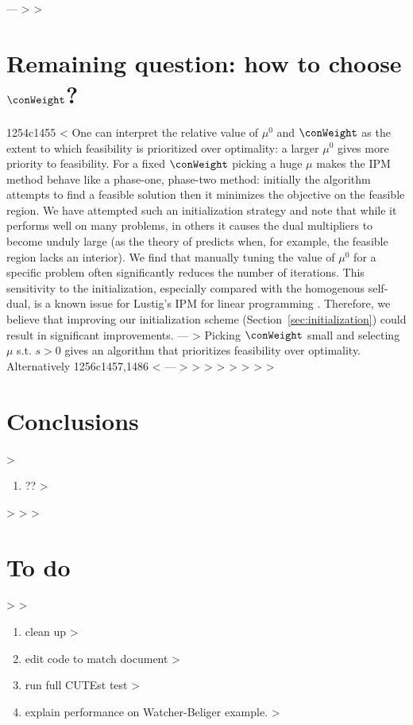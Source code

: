 ---
> \if{}
> \section{Remaining question: how to choose $\conWeight$?}
1254c1455
< One can interpret the relative value of $\mu^0$ and $\conWeight$ as the extent to which feasibility is prioritized over optimality: a larger $\mu^0$ gives more priority to feasibility. For a fixed $\conWeight$ picking a huge $\mu$ makes the IPM method behave like a phase-one, phase-two method: initially the algorithm attempts to find a feasible solution then it minimizes the objective on the feasible region. We have attempted such an initialization strategy and note that while it performs well on many problems, in others it causes the dual multipliers to become unduly large (as the theory of \cite{haeser2017behavior} predicts when, for example, the feasible region lacks an interior). We find that manually tuning the value of $\mu^0$ for a specific problem often significantly reduces the number of iterations. This sensitivity to the initialization, especially compared with the homogenous self-dual, is a known issue for Lustig's IPM for linear programming \cite[Table 1]{meszaros2015practical}. Therefore, we believe that improving our initialization scheme (Section~\ref{sec:initialization}) could result in significant improvements.
---
> Picking $\conWeight$ small and selecting $\mu$ s.t. $s > 0$ gives an algorithm that prioritizes feasibility over optimality. Alternatively 
1256c1457,1486
< %
---
> \fi
> 
> 
> \if{}
> 
> 
> 
> \section{Conclusions}
> \begin{enumerate}
> \item ??
> \end{enumerate}
> 
> 
> \section{To do}
> 
> \begin{enumerate}
> \item clean up 
> \item edit code to match document
> \item run full CUTEst test
> \item explain performance on Watcher-Beliger example.
> \end{enumerate}
